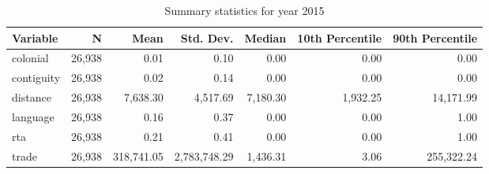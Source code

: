 \begin{table}[ht]
\centering
\begin{tabular}{lrrrrrr}
  \hline
Variable & N & Mean & Std. Dev. & Median & 10th Percentile & 90th Percentile \\ 
  \hline
colonial & 26,938 & 0.01 & 0.10 & 0.00 & 0.00 & 0.00 \\ 
  contiguity & 26,938 & 0.02 & 0.14 & 0.00 & 0.00 & 0.00 \\ 
  distance & 26,938 & 7,638.30 & 4,517.69 & 7,180.30 & 1,932.25 & 14,171.99 \\ 
  language & 26,938 & 0.16 & 0.37 & 0.00 & 0.00 & 1.00 \\ 
  rta & 26,938 & 0.21 & 0.41 & 0.00 & 0.00 & 1.00 \\ 
  trade & 26,938 & 318,741.05 & 2,783,748.29 & 1,436.31 & 3.06 & 255,322.24 \\ 
   \hline
\end{tabular}
\caption{Summary statistics for year 2015} 
\end{table}
